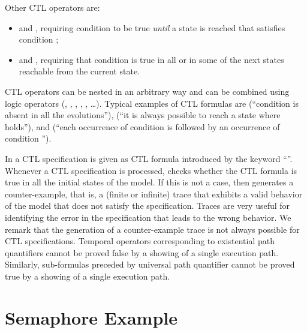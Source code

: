 Other CTL operators are:
\begin{itemize}
\item {} and , 
  requiring condition  to be true \emph{until} a state is
  reached that satisfies condition ;
\item {} and , 
  requiring that condition  is true in all or in some of the
  next states reachable from the current state.
\end{itemize}
CTL operators can be nested in an arbitrary way and can be combined
using logic operators (\code{!}, \code{\&}, \code{|}, \code{->},
\code{<->}, \ldots).
Typical examples of CTL formulas are  (``condition 
is absent in all the evolutions''),  (``it is always
possible to reach a state where  holds''), and  (``each occurrence of condition  is followed by an occurrence
of condition '').

In \nusmv a CTL specification is given as CTL formula introduced
by the keyword ``''.
Whenever a CTL specification is processed, \nusmv checks whether
the CTL formula is true in all the initial states of the model. If this
is not a case, then \nusmv generates a counter-example, that is, a
(finite or infinite) trace that exhibits a valid behavior of the model
that does not satisfy the specification. 
Traces are very useful for identifying the error in the specification that
leads to the wrong behavior.
We remark that the generation of a counter-example trace is not always
possible for CTL specifications. Temporal operators corresponding to
existential path quantifiers cannot be proved false by a showing of a
single execution path.  Similarly, sub-formulas preceded by universal
path quantifier cannot be proved true by a showing of a single execution
path.


\section{Semaphore Example}
\label{CTL Semaphore Example}

